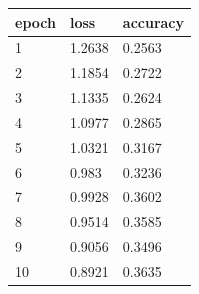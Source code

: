 \begin{tabular}{lll}
\hline
epoch & loss & accuracy \\
\hline
1 & 1.2638 & 0.2563 \\
2 & 1.1854 & 0.2722 \\
3 & 1.1335 & 0.2624 \\
4 & 1.0977 & 0.2865 \\
5 & 1.0321 & 0.3167 \\
6 & 0.983 & 0.3236 \\
7 & 0.9928 & 0.3602 \\
8 & 0.9514 & 0.3585 \\
9 & 0.9056 & 0.3496 \\
10 & 0.8921 & 0.3635 \\
\hline
\end{tabular}
